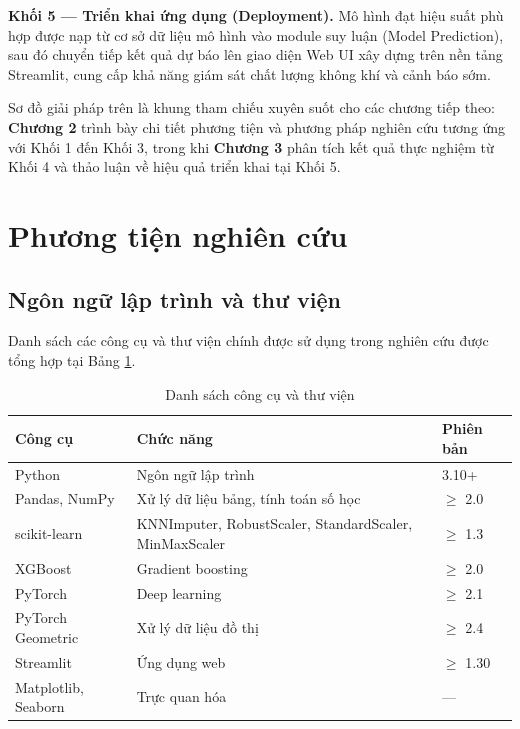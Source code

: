 \textbf{Khối 5 --- Triển khai ứng dụng (Deployment).} Mô hình đạt hiệu suất phù hợp được nạp từ cơ sở dữ liệu mô hình vào module suy luận (Model Prediction), sau đó chuyển tiếp kết quả dự báo lên giao diện Web UI xây dựng trên nền tảng Streamlit, cung cấp khả năng giám sát chất lượng không khí và cảnh báo sớm.

Sơ đồ giải pháp trên là khung tham chiếu xuyên suốt cho các chương tiếp theo: \textbf{Chương 2} trình bày chi tiết phương tiện và phương pháp nghiên cứu tương ứng với Khối 1 đến Khối 3, trong khi \textbf{Chương 3} phân tích kết quả thực nghiệm từ Khối 4 và thảo luận về hiệu quả triển khai tại Khối 5.


\section{Phương tiện nghiên cứu}

\subsection{Ngôn ngữ lập trình và thư viện}

Danh sách các công cụ và thư viện chính được sử dụng trong nghiên cứu được tổng hợp tại Bảng \ref{tab:cong_cu_thu_vien}.

\begin{table}[H]
    \centering
    \caption{Danh sách công cụ và thư viện}
    \label{tab:cong_cu_thu_vien}
    \renewcommand{\arraystretch}{1.3}
    \begin{tabular}{p{4cm} p{6.5cm} p{3cm}}
    \toprule
    \textbf{Công cụ} & \textbf{Chức năng} & \textbf{Phiên bản} \\
    \midrule
    Python & Ngôn ngữ lập trình & 3.10+ \\
    Pandas, NumPy & Xử lý dữ liệu bảng, tính toán số học & $\ge$ 2.0 \\
    scikit-learn & KNNImputer, RobustScaler, StandardScaler, MinMaxScaler & $\ge$ 1.3 \\
    XGBoost & Gradient boosting & $\ge$ 2.0 \\
    PyTorch & Deep learning & $\ge$ 2.1 \\
    PyTorch Geometric & Xử lý dữ liệu đồ thị & $\ge$ 2.4 \\
    Streamlit & Ứng dụng web & $\ge$ 1.30 \\
    Matplotlib, Seaborn & Trực quan hóa & --- \\
    \bottomrule
    \end{tabular}
\end{table}

